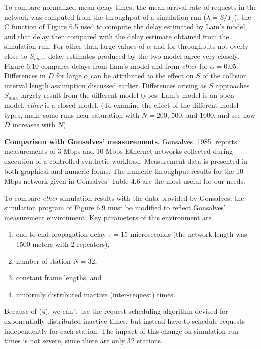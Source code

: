 To compare normalized mean delay times, the mean arrival rate of requests in the network was computed from the throughput of a simulation run ($\lambda=S/T_f$), the C function of Figure 6.5 used to compute the delay estimated by Lam's model, and that delay then compared with the delay estimate obtained from the simulation run. For other than large values of $\alpha$ and for throughputs not overly close to $S_{max}$, delay estimates produced by the two model agree very closely. Figure 6.10 compares delays from Lam's model and from \emph{ether} for $\alpha=0.05$. Differences in $D$ for large $\alpha$ can be attributed to the effect on $S$ of the collision interval length assumption discussed earlier. Differences arising as $S$ approaches $S_{max}$ largely result from the different model types: Lam's model is an open model, \emph{ether} is a closed model. (To
\noindent examine the effect of the different model types, make some runs near saturation with $N=200$, 500, and 1000, and see how $D$ increases with $N$)

\noindent\textbf{Comparison with Gonsalves' measurements.} Gonsalves [1985] reports measurements of 3 Mbps and 10 Mbps Ethernet networks collected during execution of a controlled synthetic workload. Measurement data is presented in both graphical and numeric forms. The numeric throughput results for the 10 Mbps network given in Gonsalves' Table 4.6 are the most useful for our needs.

To compare \emph{ether} simulation results with the data provided by Gonsalves, the simulation program of Figure 6.9 must be modified to reflect Gonsalves' measurement environment. Key parameters of this environment are
\begin{enumerate}
\item end-to-end propagation delay $\tau=15$ microseconds (the network length was 1500 meters with 2 repeaters),
\item number of station $N=32$,
\item constant frame lengths, and
\item uniformly distributed inactive (inter-request) times.
\end{enumerate}
Because of (4), we can't use the request scheduling algorithm devised for exponentially distributed inactive times, but instead have to schedule requests independently for each station. The impact of this change on simulation run times is not severe, since there are only 32 stations.

